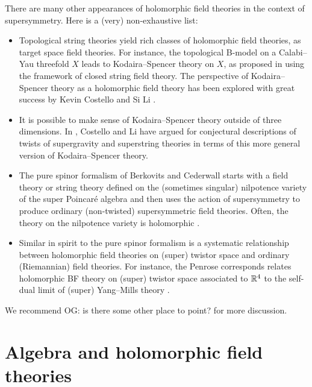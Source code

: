 \documentclass[11pt]{amsart}
\def\owen#1{{\textcolor{violet!50!black}{OG: {#1}}}}
\begin{document}
There are many other appearances of holomorphic field theories in the context of supersymmetry.
Here is a (very) non-exhaustive list:
\begin{itemize}
\item Topological string theories yield rich classes of holomorphic field theories, as target space field theories. 
For instance, the topological B-model on a Calabi--Yau threefold $X$ leads to Kodaira--Spencer theory on $X$, as proposed in \cite{BCOV} using the framework of closed string field theory. 
The perspective of Kodaira--Spencer theory as a holomorphic field theory has been explored with great success by Kevin Costello and Si Li \cite{CLbcov, CLtypeI}.
\item
It is possible to make sense of Kodaira--Spencer theory outside of three dimensions.
In \cite{CLsugra}, Costello and Li have argued for conjectural descriptions of twists of supergravity and superstring theories in terms of this more general version of Kodaira--Spencer theory.
\item The pure spinor formalism of Berkovits and Cederwall  \cite{Cederwall, Berkovits} starts with a field theory or string theory defined on the (sometimes singular) nilpotence variety of the super Poincar\'e algebra and then uses the action of supersymmetry to produce ordinary (non-twisted) supersymmetric field theories. 
Often, the theory on the nilpotence variety is holomorphic \cite{ESW,SWpure}. 
\item Similar in spirit to the pure spinor formalism is a systematic relationship between holomorphic field theories on (super) twistor space and ordinary (Riemannian) field theories.
For instance, the Penrose corresponds relates holomorphic BF theory on (super) twistor space associated to $\mathbb R^4$ to the self-dual limit of (super) Yang--Mills theory \cite{Penrose, Kevins work..., other twistor literature}.
\end{itemize}
We recommend \owen{is there some other place to point?} for more discussion.

\section{Algebra and holomorphic field theories}
\label{sec: algebra}
\end{document}
